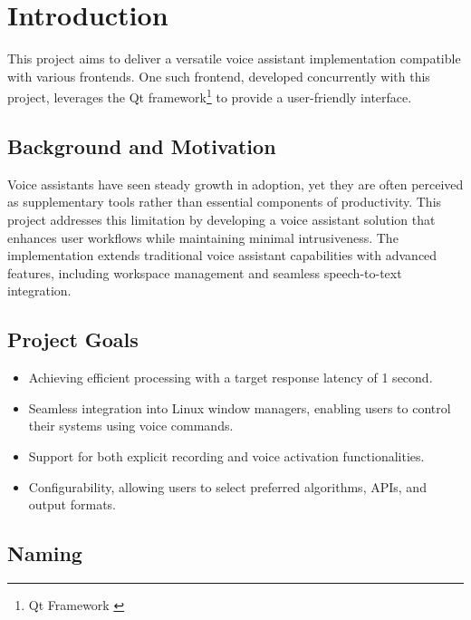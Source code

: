 \cleardoubleemptypage
\renewcommand*\chapterpagestyle{scrheadings}
\chapter{Introduction}

This project aims to deliver a versatile voice assistant implementation
compatible with various frontends. One such frontend,
developed concurrently with this project,
leverages the Qt framework\footnote{Qt Framework \cite{qt}}
to provide a user-friendly interface.

\section{Background and Motivation}
Voice assistants have seen steady growth in adoption,
yet they are often perceived as supplementary tools
rather than essential components of productivity.
This project addresses this limitation by developing a voice assistant solution
that enhances user workflows while maintaining minimal intrusiveness.
The implementation extends traditional voice assistant capabilities
with advanced features, including workspace management and seamless speech-to-text integration.

\section{Project Goals}
\begin{itemize}
    \item Achieving efficient processing with a target response latency of 1 second.
    \item Seamless integration into Linux window managers, enabling users to control their systems using voice commands.
    \item Support for both explicit recording and voice activation functionalities.
    \item Configurability, allowing users to select preferred algorithms, APIs, and output formats.
\end{itemize}

\section{Naming} \label{sec:naming}